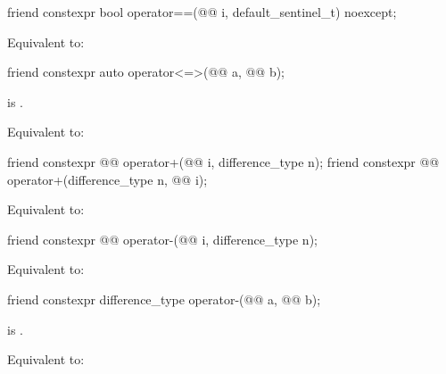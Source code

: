 \begin{itemdecl}
friend constexpr bool operator==(@@ i, default_sentinel_t) noexcept;
\end{itemdecl}

\begin{itemdescr}
\pnum
\effects
Equivalent to: 
\end{itemdescr}

\begin{itemdecl}
friend constexpr auto operator<=>(@@ a, @@ b);
\end{itemdecl}

\begin{itemdescr}
\pnum
\expects
{} is .

\pnum
\effects
Equivalent to: 
\end{itemdescr}

\begin{itemdecl}
friend constexpr @@ operator+(@@ i, difference_type n);
friend constexpr @@ operator+(difference_type n, @@ i);
\end{itemdecl}

\begin{itemdescr}
\pnum
\effects
Equivalent to: 
\end{itemdescr}

\begin{itemdecl}
friend constexpr @@ operator-(@@ i, difference_type n);
\end{itemdecl}

\begin{itemdescr}
\pnum
\effects
Equivalent to: 
\end{itemdescr}

\begin{itemdecl}
friend constexpr difference_type operator-(@@ a, @@ b);
\end{itemdecl}

\begin{itemdescr}
\pnum
\expects
{} is .

\pnum
\effects
Equivalent to: 
\end{itemdescr}


